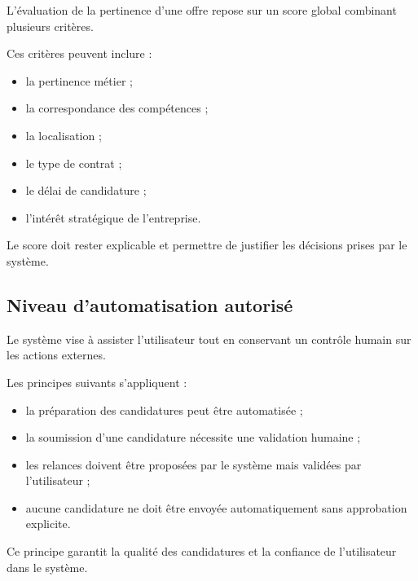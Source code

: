 \documentclass[11pt,a4paper]{article}
\begin{document}
L’évaluation de la pertinence d’une offre repose sur un score global combinant plusieurs critères.

Ces critères peuvent inclure :

\begin{itemize}
\item la pertinence métier ;
\item la correspondance des compétences ;
\item la localisation ;
\item le type de contrat ;
\item le délai de candidature ;
\item l’intérêt stratégique de l’entreprise.
\end{itemize}

Le score doit rester explicable et permettre de justifier les décisions prises par le système.

\subsection{Niveau d’automatisation autorisé}

Le système vise à assister l’utilisateur tout en conservant un contrôle humain sur les actions externes.

Les principes suivants s’appliquent :

\begin{itemize}
\item la préparation des candidatures peut être automatisée ;
\item la soumission d’une candidature nécessite une validation humaine ;
\item les relances doivent être proposées par le système mais validées par l’utilisateur ;
\item aucune candidature ne doit être envoyée automatiquement sans approbation explicite.
\end{itemize}

Ce principe garantit la qualité des candidatures et la confiance de l’utilisateur dans le système.
\end{document}
